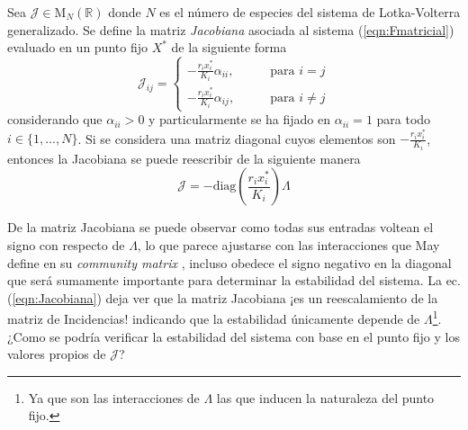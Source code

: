 \newpage
\begin{definición}\label{def:MatrizJacobiana}
	Sea $\mathcal{J}\in\mathrm{M}_N(\mathbb{R})$ donde $N$ es el número de especies del sistema de Lotka-Volterra generalizado. Se define la matriz \textit{Jacobiana} asociada al sistema (\ref{eqn:Fmatricial}) evaluado en un punto fijo $X^*$ de la siguiente forma
	\begin{equation}\label{eqn:MartizJacobiana}
		\mathcal{J}_{ij}=\begin{cases}
			-\frac{r_ix_i^*}{K_i}\alpha_{ii},\qquad&\text{para }i=j\\
			-\frac{r_ix_i^*}{K_i}\alpha_{ij},\qquad&\text{para }i\neq j
		\end{cases}
	\end{equation}
	considerando que $\alpha_{ii}>0$ y particularmente se ha fijado en $\alpha_{ii}=1$ para todo $i\in\{1,...,N\}$. Si se considera una matriz diagonal cuyos elementos son $-\frac{r_ix_i^*}{K_i}$, entonces la Jacobiana se puede reescribir de la siguiente manera
	\begin{equation}\label{eqn:Jacobiana}
		\mathcal{J}=-\text{diag}\left (\frac{r_ix_i^*}{K_i}\right )\Lambda
	\end{equation}
\end{definición}
De la matriz Jacobiana se puede observar como todas sus entradas voltean el signo con respecto de $\Lambda$, lo que parece ajustarse con las interacciones que May define en su \textit{community matrix} \cite{may2019stability}, incluso obedece el signo negativo en la diagonal que será sumamente importante para determinar la estabilidad del sistema. La ec. (\ref{eqn:Jacobiana}) deja ver que la matriz Jacobiana ¡es un reescalamiento de la matriz de Incidencias! indicando que la estabilidad únicamente depende de $\Lambda$\footnote{Ya que son las interacciones de $\Lambda$ las que inducen la naturaleza del punto fijo.}. ¿Como se podría verificar la estabilidad del sistema con base en el punto fijo y los valores propios de $\mathcal{J}$?

